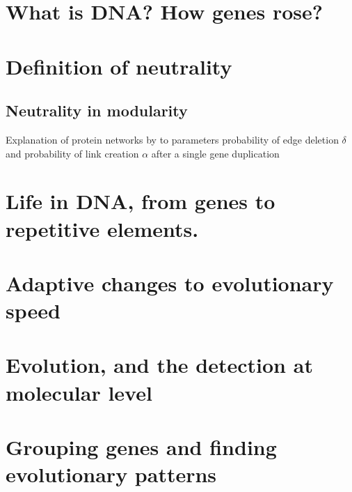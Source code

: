 

\section{What is DNA? How genes rose?}
\section{Definition of neutrality}
\subsection{Neutrality in modularity}

Explanation of protein networks by to parameters probability of edge deletion $\delta$ and probability of link creation $\alpha$ after a single gene duplication \cite{Sole2008}

\section{Life in DNA, from genes to repetitive elements.}
\section{Adaptive changes to evolutionary speed}
\section{Evolution, and the detection at molecular level}
\section{Grouping genes and finding evolutionary patterns}


